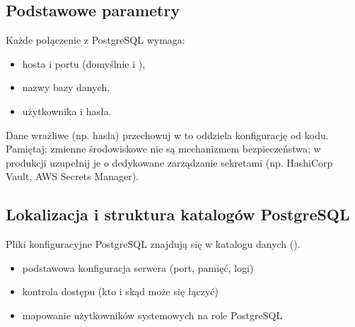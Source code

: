 \documentclass[letterpaper,10pt,polish]{sphinxmanual}
\begin{document}
\subsection{Podstawowe parametry}
\label{\detokenize{rozdzia_u0142_2/rozdzia_u0142_22/index:podstawowe-parametry}}
\sphinxAtStartPar
Każde połączenie z PostgreSQL wymaga:
\begin{itemize}
\item {} 
\sphinxAtStartPar
hosta i portu (domyślnie  i ),

\item {} 
\sphinxAtStartPar
nazwy bazy danych,

\item {} 
\sphinxAtStartPar
użytkownika i hasła.

\end{itemize}

\sphinxAtStartPar
Dane wrażliwe (np. hasła) przechowuj w  \textendash{} to oddziela konfigurację od kodu.
Pamiętaj: zmienne środowiskowe nie są mechanizmem bezpieczeństwa; w produkcji uzupełnij je o dedykowane
zarządzanie sekretami (np. HashiCorp Vault, AWS Secrets Manager).


\subsection{Lokalizacja i struktura katalogów PostgreSQL}
\label{\detokenize{rozdzia_u0142_2/rozdzia_u0142_22/index:lokalizacja-i-struktura-katalogow-postgresql}}
\sphinxAtStartPar
Pliki konfiguracyjne PostgreSQL znajdują się w katalogu danych ().

\sphinxAtStartPar
{}
\begin{itemize}
\item {} 
\sphinxAtStartPar
{} \textendash{} podstawowa konfiguracja serwera (port, pamięć, logi)

\item {} 
\sphinxAtStartPar
{} \textendash{} kontrola dostępu (kto i skąd może się łączyć)

\item {} 
\sphinxAtStartPar
{} \textendash{} mapowanie użytkowników systemowych na role PostgreSQL

\end{itemize}
\end{document}
